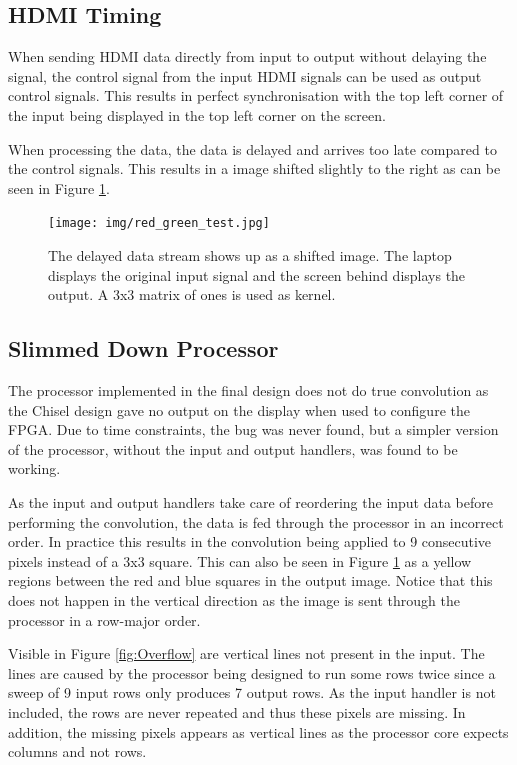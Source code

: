 \subsection{HDMI Timing}
When sending HDMI data directly from input to output without delaying the signal, the control signal from the input HDMI signals can be used as output control signals.
This results in perfect synchronisation with the top left corner of the input being displayed in the top left corner on the screen.

When processing the data, the data is delayed and arrives too late compared to the control signals. This results in a image shifted slightly to the right as can be seen in Figure \ref{fig:SyncDelay}.

\begin{figure}
    \centering
    \texttt{[image: img/red\_green\_test.jpg]}
    \caption[The delayed data stream]{
        The delayed data stream shows up as a shifted image.
        The laptop displays the original input signal and the screen behind displays the output.
        A 3x3 matrix of ones is used as kernel.
    }
    \label{fig:SyncDelay}
\end{figure}

\subsection{Slimmed Down Processor}
The processor implemented in the final design does not do true convolution as the Chisel design gave no output on the display when used to configure the FPGA.
Due to time constraints, the bug was never found, but a simpler version of the processor, without the input and output handlers, was found to be working.

As the input and output handlers take care of reordering the input data before performing the convolution, the data is fed through the processor in an incorrect order.
In practice this results in the convolution being applied to 9 consecutive pixels instead of a 3x3 square.
This can also be seen in Figure \ref{fig:SyncDelay} as a yellow regions between the red and blue squares in the output image.
Notice that this does not happen in the vertical direction as the image is sent through the processor in a row-major order.

Visible in Figure \ref{fig:Overflow} are vertical lines not present in the input.
The lines are caused by the processor being designed to run some rows twice since a sweep of 9 input rows only produces 7 output rows.
As the input handler is not included, the rows are never repeated and thus these pixels are missing.
In addition, the missing pixels appears as vertical lines as the processor core expects columns and not rows.

